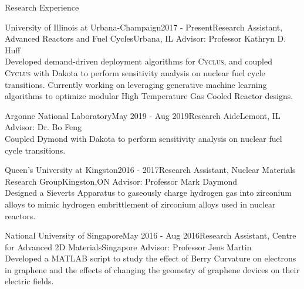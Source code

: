 \documentclass{resume2} %
\begin{document}

\begin{rSection}{Research Experience}

\begin{rSubsection}{University of Illinois at Urbana-Champaign}{2017 - Present}{Research Assistant, Advanced Reactors and Fuel Cycles}{Urbana, IL}
Advisor: Professor Kathryn D. Huff \\
Developed demand-driven deployment algorithms for \textsc{Cyclus}, and coupled \textsc{Cyclus} with Dakota 
to perform sensitivity analysis on nuclear fuel cycle transitions. Currently working on leveraging generative 
machine learning algorithms to optimize modular High Temperature Gas Cooled Reactor designs. 
\end{rSubsection}

\begin{rSubsection}{Argonne National Laboratory}{May 2019 - Aug 2019}{Research Aide}{Lemont, IL}
Advisor: Dr. Bo Feng \\ 
Coupled Dymond with Dakota to perform sensitivity analysis on nuclear fuel cycle transitions.
\end{rSubsection}

\begin{rSubsection}{Queen's University at Kingston}{2016 - 2017}{Research Assistant, Nuclear Materials Research Group}{Kingston,ON}
Advisor: Professor Mark Daymond \\
Designed a Sieverts Apparatus to gaseously charge hydrogen gas into zirconium alloys to 
mimic hydrogen embrittlement of zirconium alloys used in nuclear reactors.
\iffalse
The design is being implemented at Reactor Materials Testing Laboratory to test how hydrogen embrittled zirconium alloys respond in nuclear reactor conditions
 Application to nuclear industry: zirconium alloys used in nuclear reactors succumb to hydrogen embrittlement during its lifetime, therefore, it is important to be able to replicate the conditions in nuclear reactors, so as to study its end-of-life conditions
\fi
\end{rSubsection}

\begin{rSubsection}{National University of Singapore}{May 2016 - Aug 2016}{Research Assistant, Centre for Advanced 2D Materials}{Singapore}
Advisor: Professor Jens Martin \\	 
Developed a MATLAB script to study the effect of Berry Curvature on electrons in graphene and the 
effects of changing the geometry of graphene devices on their electric fields. 
\iffalse
Both programs were used to assist graduate students in their design of nano-graphene devices
\fi
\end{rSubsection}


\end{rSection}
\end{document}
